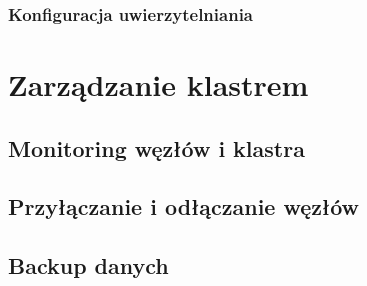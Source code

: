 \documentclass{article} %
\begin{document}
\subsubsection{Konfiguracja uwierzytelniania}

\section{Zarządzanie klastrem}

\subsection{Monitoring węzłów i klastra}

\subsection{Przyłączanie i odłączanie węzłów}

\subsection{Backup danych}

\pagebreak
\end{document}
